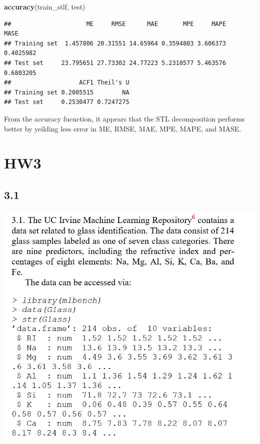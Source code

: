 \documentclass[]{book}
\newenvironment{Shaded}{\begin{snugshade}}{\end{snugshade}}
\newcommand{\KeywordTok}[1]{\textcolor[rgb]{0.13,0.29,0.53}{\textbf{#1}}}
\newcommand{\NormalTok}[1]{#1}
\begin{document}
\begin{Shaded}
\begin{Highlighting}[]
\KeywordTok{accuracy}\NormalTok{(train_stlf, test)}
\end{Highlighting}
\end{Shaded}

\begin{verbatim}
##                     ME     RMSE      MAE       MPE     MAPE      MASE
## Training set  1.457806 20.31551 14.65964 0.3594803 3.606373 0.4025982
## Test set     23.795651 27.73302 24.77223 5.2310577 5.463576 0.6803205
##                   ACF1 Theil's U
## Training set 0.2005515        NA
## Test set     0.2530477 0.7247275
\end{verbatim}

From the accuracy fucnction, it appears that the STL decomposition performs better by yeilding less error in ME, RMSE, MAE, MPE, MAPE, and MASE.

\hypertarget{hw3}{%
\chapter{HW3}\label{hw3}}

\hypertarget{section-7}{%
\section{3.1}\label{section-7}}

\includegraphics{./week3/3.1.png}
\end{document}
